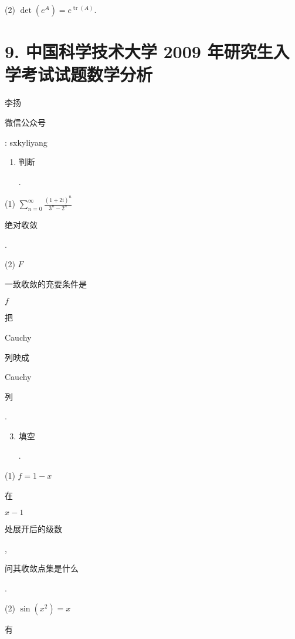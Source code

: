 \documentclass[10pt]{article}
\begin{document}
(2) $\operatorname{det}\left(e^{A}\right)=e^{\operatorname{tr}(A)}$.

\section{9. 中国科学技术大学 2009 年研究生入学考试试题数学分析}
\begin{CJK}{UTF8}{mj}李扬\end{CJK}

\begin{CJK}{UTF8}{mj}微信公众号\end{CJK}: sxkyliyang

\begin{enumerate}
  \item \begin{CJK}{UTF8}{mj}判断\end{CJK}.
\end{enumerate}
(1) $\sum_{n=0}^{\infty} \frac{(1+2 \mathrm{i})^{n}}{3^{n}-2^{n}}$ \begin{CJK}{UTF8}{mj}绝对收敛\end{CJK}.

(2) $F$ \begin{CJK}{UTF8}{mj}一致收敛的充要条件是\end{CJK} $f$ \begin{CJK}{UTF8}{mj}把\end{CJK} Cauchy \begin{CJK}{UTF8}{mj}列映成\end{CJK} Cauchy \begin{CJK}{UTF8}{mj}列\end{CJK}.

\begin{enumerate}
  \setcounter{enumi}{2}
  \item \begin{CJK}{UTF8}{mj}填空\end{CJK}.
\end{enumerate}
(1) $f=1-x$ \begin{CJK}{UTF8}{mj}在\end{CJK} $x-1$ \begin{CJK}{UTF8}{mj}处展开后的级数\end{CJK}, \begin{CJK}{UTF8}{mj}问其收敛点集是什么\end{CJK}.

(2) $\sin \left(x^{2}\right)=x$ \begin{CJK}{UTF8}{mj}有\end{CJK}
\end{document}
